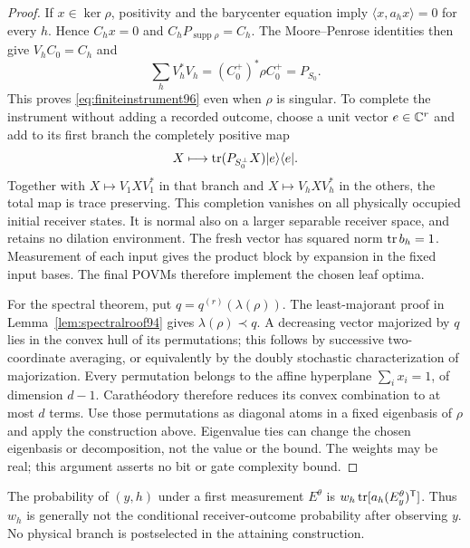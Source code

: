 \begin{proof}
If $x\in\ker\rho$, positivity and the barycenter equation imply
$\langle x,a_hx\rangle=0$ for every $h$.  Hence $C_hx=0$ and
$C_hP_{\operatorname{supp}\rho}=C_h$.  The Moore--Penrose identities
then give $V_hC_0=C_h$ and
\[
 \sum_hV_h^*V_h=(C_0^+)^*\rho C_0^+=P_{S_0}.
\]
This proves \eqref{eq:finiteinstrument96} even when $\rho$ is singular.
To complete the instrument without adding a recorded outcome, choose
a unit vector $e\in\mathbb C^r$ and add to its first branch the completely
positive map
\[
             X\longmapsto\operatorname{tr}(P_{S_0^\perp}X)|e\rangle\langle e|.
\]
Together with $X\mapsto V_1XV_1^*$ in that branch and
$X\mapsto V_hXV_h^*$ in the others, the total map is trace
preserving.  This completion vanishes on all physically occupied
initial receiver states.  It is normal also on a larger separable
receiver space, and retains no dilation environment.  The fresh vector
has squared norm $\operatorname{tr} b_h=1$.  Measurement of each input gives the
product block by expansion in the fixed input bases.  The final POVMs
therefore implement the chosen leaf optima.

For the spectral theorem, put $q=q^{(r)}(\lambda(\rho))$.
The least-majorant proof in Lemma~\ref{lem:spectralroof94} gives
$\lambda(\rho)\prec q$.  A decreasing vector majorized by $q$ lies
in the convex hull of its permutations; this follows by successive
two-coordinate averaging, or equivalently by the doubly stochastic
characterization of majorization.  Every permutation belongs to the
affine hyperplane $\sum_i x_i=1$, of dimension $d-1$.  Carath\'eodory
therefore reduces its convex combination to at most $d$ terms.
Use those permutations as diagonal atoms in a fixed eigenbasis of
$\rho$ and apply the construction above.  Eigenvalue ties can change
the chosen eigenbasis or decomposition, not the value or the bound.
The weights may be real; this argument asserts no bit or gate
complexity bound.
\end{proof}
The probability of $(y,h)$ under a first measurement $E^\theta$ is
$w_h\operatorname{tr}[a_h(E_y^\theta)^{\mathsf T}]$.  Thus $w_h$ is generally not
the conditional receiver-outcome probability after observing $y$.
No physical branch is postselected in the attaining construction.

